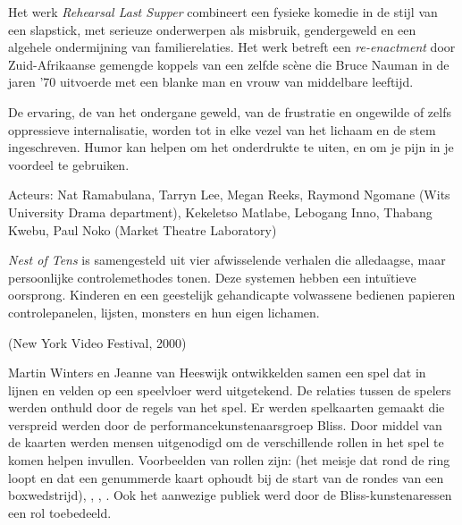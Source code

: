 {{Het werk {\em Rehearsal Last Supper} combineert een fysieke komedie
in de stijl van een slapstick, met serieuze onderwerpen als misbruik,
gendergeweld en een algehele ondermijning van familierelaties. Het werk
betreft een {\em re{}-enactment} door Zuid{}-Afrikaanse gemengde
koppels van een zelfde sc\`ene die Bruce Nauman in de jaren '70
uitvoerde met een blanke man en vrouw van middelbare leeftijd.

De ervaring, de  van het ondergane geweld, van de frustratie en
ongewilde of zelfs oppressieve internalisatie, worden tot in elke vezel
van het lichaam en de stem ingeschreven. Humor kan helpen om het
onderdrukte te uiten, en om je pijn in je voordeel te gebruiken.

Acteurs: Nat Ramabulana, Tarryn Lee, Megan Reeks, Raymond Ngomane (Wits
University Drama department), Kekeletso Matlabe, Lebogang Inno, Thabang
Kwebu, Paul Noko (Market Theatre Laboratory) 
\blank
{}


{\em Nest of Tens} is samengesteld uit vier afwisselende verhalen die
alledaagse, maar persoonlijke controlemethodes tonen. Deze systemen
hebben een intu\"itieve oorsprong. Kinderen en een geestelijk
gehandicapte volwassene bedienen papieren controlepanelen, lijsten,
monsters en hun eigen lichamen.

 (New York
Video Festival, 2000)


Martin Winters en Jeanne van Heeswijk ontwikkelden samen een spel dat in
lijnen en velden op een speelvloer werd uitgetekend. De relaties tussen
de spelers werden onthuld door de regels van het spel. Er werden
spelkaarten gemaakt die verspreid werden door de
performancekunstenaarsgroep Bliss. Door middel van de kaarten werden
mensen uitgenodigd om de verschillende rollen in het spel te komen
helpen invullen. Voorbeelden van rollen zijn:  (het meisje
dat rond de ring loopt en dat een genummerde kaart ophoudt bij de start
van de rondes van een boxwedstrijd), , , . Ook het aanwezige
publiek werd door de Bliss{}-kunstenaressen een rol toebedeeld. 

}}
